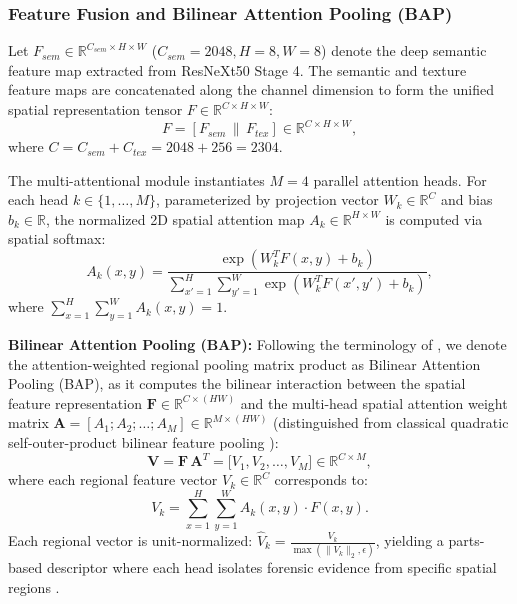 \subsubsection{Feature Fusion and Bilinear Attention Pooling (BAP)}
Let $F_{sem} \in \mathbb{R}^{C_{sem} \times H \times W}$ ($C_{sem} = 2048, H=8, W=8$) denote the deep semantic feature map extracted from ResNeXt50 Stage 4. The semantic and texture feature maps are concatenated along the channel dimension to form the unified spatial representation tensor $F \in \mathbb{R}^{C \times H \times W}$:
\begin{equation}
    F = [F_{sem} \,\|\, F_{tex}] \in \mathbb{R}^{C \times H \times W},
\end{equation}
where $C = C_{sem} + C_{tex} = 2048 + 256 = 2304$.

The multi-attentional module instantiates $M=4$ parallel attention heads. For each head $k \in \{1, \dots, M\}$, parameterized by projection vector $W_k \in \mathbb{R}^C$ and bias $b_k \in \mathbb{R}$, the normalized 2D spatial attention map $A_k \in \mathbb{R}^{H \times W}$ is computed via spatial softmax:
\begin{equation}
    A_k(x,y) = \frac{\exp(W_k^T F(x,y) + b_k)}{\sum_{x'=1}^{H} \sum_{y'=1}^{W} \exp(W_k^T F(x',y') + b_k)},
\end{equation}
where $\sum_{x=1}^H \sum_{y=1}^W A_k(x,y) = 1$.

\textbf{Bilinear Attention Pooling (BAP):} Following the terminology of \citet{Zhao2021MultiAttentional}, we denote the attention-weighted regional pooling matrix product as Bilinear Attention Pooling (BAP), as it computes the bilinear interaction between the spatial feature representation $\mathbf{F} \in \mathbb{R}^{C \times (HW)}$ and the multi-head spatial attention weight matrix $\mathbf{A} = [A_1; A_2; \dots; A_M] \in \mathbb{R}^{M \times (HW)}$ (distinguished from classical quadratic self-outer-product bilinear feature pooling \citep{Lin2015Bilinear}):
\begin{equation}
    \mathbf{V} = \mathbf{F} \, \mathbf{A}^T = \big[V_1, V_2, \dots, V_M\big] \in \mathbb{R}^{C \times M},
\end{equation}
where each regional feature vector $V_k \in \mathbb{R}^C$ corresponds to:
\begin{equation}
    V_k = \sum_{x=1}^{H} \sum_{y=1}^{W} A_k(x,y) \cdot F(x,y).
\end{equation}
Each regional vector is unit-normalized: $\hat{V}_k = \frac{V_k}{\max(\|V_k\|_2, \epsilon)}$, yielding a parts-based descriptor where each head isolates forensic evidence from specific spatial regions \citep{Zhao2021MultiAttentional}.

